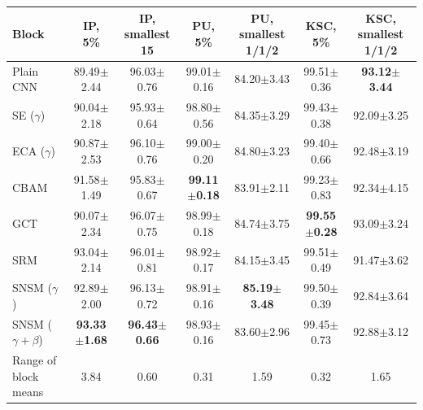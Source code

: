 \begin{tabular}{lcccccc}
\toprule
Block & IP, 5\% & IP, smallest 15 & PU, 5\% & PU, smallest 1/1/2 & KSC, 5\% & KSC, smallest 1/1/2 \\
\midrule
Plain CNN & 89.49$\pm$2.44 & 96.03$\pm$0.76 & 99.01$\pm$0.16 & 84.20$\pm$3.43 & 99.51$\pm$0.36 & \textbf{93.12$\pm$3.44} \\
SE ($\gamma$) & 90.04$\pm$2.18 & 95.93$\pm$0.64 & 98.80$\pm$0.56 & 84.35$\pm$3.29 & 99.43$\pm$0.38 & 92.09$\pm$3.25 \\
ECA ($\gamma$) & 90.87$\pm$2.53 & 96.10$\pm$0.76 & 99.00$\pm$0.20 & 84.80$\pm$3.23 & 99.40$\pm$0.66 & 92.48$\pm$3.19 \\
CBAM & 91.58$\pm$1.49 & 95.83$\pm$0.67 & \textbf{99.11$\pm$0.18} & 83.91$\pm$2.11 & 99.23$\pm$0.83 & 92.34$\pm$4.15 \\
GCT & 90.07$\pm$2.34 & 96.07$\pm$0.75 & 98.99$\pm$0.18 & 84.74$\pm$3.75 & \textbf{99.55$\pm$0.28} & 93.09$\pm$3.24 \\
SRM & 93.04$\pm$2.14 & 96.01$\pm$0.81 & 98.92$\pm$0.17 & 84.15$\pm$3.45 & 99.51$\pm$0.49 & 91.47$\pm$3.62 \\
SNSM ($\gamma$) & 92.89$\pm$2.00 & 96.13$\pm$0.72 & 98.91$\pm$0.16 & \textbf{85.19$\pm$3.48} & 99.50$\pm$0.39 & 92.84$\pm$3.64 \\
SNSM ($\gamma{+}\beta$) & \textbf{93.33$\pm$1.68} & \textbf{96.43$\pm$0.66} & 98.93$\pm$0.16 & 83.60$\pm$2.96 & 99.45$\pm$0.73 & 92.88$\pm$3.12 \\
\midrule
Range of block means & 3.84 & 0.60 & 0.31 & 1.59 & 0.32 & 1.65 \\
\bottomrule
\end{tabular}
